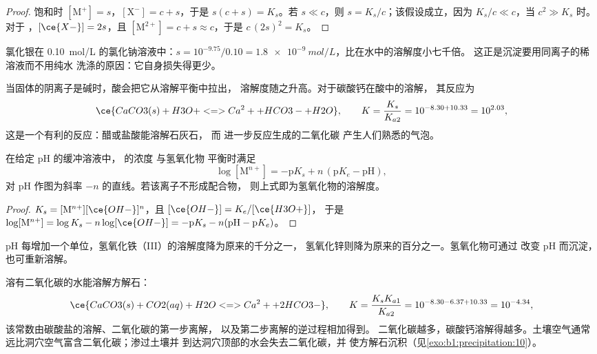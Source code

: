 \begin{proof}
饱和时 $[\mathrm{M}^+] = s$，$[\mathrm{X}^-] = c + s$，于是
$s(c + s) = K_s$。若 $s \ll c$，则 $s = K_s/c$；该假设成立，因为
$K_s/c \ll c$，当 $c^2 \gg K_s$ 时。对于 ，$[\ce{X-}] = 2s$，且
$[\mathrm{M}^{2+}] = c + s \approx c$，于是 $c\,(2s)^2 = K_s$。
\end{proof}

氯化银在 \qty{0.10}{mol/L} 的氯化钠溶液中：$s = 10^{-9.75}/0.10
= \qty{1.8e-9}{mol/L}$，比在水中的溶解度小七千倍。
这正是沉淀要用同离子的稀溶液而不用纯水
洗涤的原因：它自身损失得更少。

当固体的阴离子是碱时，酸会把它从溶解平衡中拉出，
溶解度随之升高。对于碳酸钙在酸中的溶解，
其反应为
\[
  \ce{CaCO3(s) + H3O+ <=> Ca^2+ + HCO3- + H2O}, \qquad
  K = \frac{K_s}{K_{a2}} = 10^{-8.30 + 10.33} = 10^{2.03} ,
\]
这是一个有利的反应：醋或盐酸能溶解石灰石，
而  进一步反应生成的二氧化碳
产生人们熟悉的气泡。

\begin{proposition}\label{prop:b1:precipitation:hydroxide-ph}
在给定 pH 的缓冲溶液中， 的浓度
与氢氧化物  平衡时满足
\[
  \log[\mathrm{M}^{n+}] = -\mathrm{p}K_s + n\,(\mathrm{p}K_e - \mathrm{pH}) ,
\]
对 pH 作图为斜率 $-n$ 的直线。若该离子不形成配合物，
则上式即为氢氧化物的溶解度。
\end{proposition}

\begin{proof}
$K_s = [\mathrm{M}^{n+}][\ce{OH-}]^n$，且 $[\ce{OH-}] = K_e/[\ce{H3O+}]$，
于是 $\log[\mathrm{M}^{n+}] = \log K_s - n\log[\ce{OH-}] = -\mathrm{p}K_s -
n(\mathrm{pH} - \mathrm{p}K_e)$。
\end{proof}

pH 每增加一个单位，氢氧化铁（III）的溶解度降为原来的千分之一，
氢氧化锌则降为原来的百分之一。氢氧化物可通过
改变 pH 而沉淀，也可重新溶解。

\begin{example}[用二氧化碳溶解碳酸钙]\label{ex:b1:precipitation:cave}
溶有二氧化碳的水能溶解方解石：
\[
  \ce{CaCO3(s) + CO2(aq) + H2O <=> Ca^2+ + 2HCO3-}, \qquad
  K = \frac{K_s K_{a1}}{K_{a2}} = 10^{-8.30 - 6.37 + 10.33} = 10^{-4.34} ,
\]
该常数由碳酸盐的溶解、二氧化碳的第一步离解，
以及第二步离解的逆过程相加得到。
二氧化碳越多，碳酸钙溶解得越多。土壤空气通常
远比洞穴空气富含二氧化碳；渗过土壤并
到达洞穴顶部的水会失去二氧化碳，并
使方解石沉积（见\cref{exo:b1:precipitation:10}）。
\end{example}

